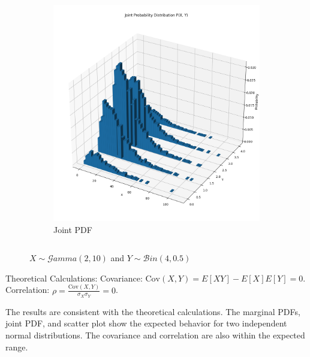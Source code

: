 \documentclass{article}
\begin{document}
\begin{figure}[H]
\begin{subfigure}{0.45\textwidth}
    \includegraphics[width=\linewidth]{results/section2/c(2).png}
    \caption{Joint PDF}
  \end{subfigure}

  \begin{subfigure}{\textwidth}
    \inputminted{text}{results/section2/c.txt}
  \end{subfigure}
  \caption{$X \sim \mathcal{G}amma(2,10)$ and $Y \sim \mathcal{B}in(4,0.5)$}
\end{figure}
Theoretical Calculations:
Covariance: $\text{Cov}(X,Y) = E[XY] - E[X]E[Y] = 0$.
Correlation: $\rho = \frac{\text{Cov}(X,Y)}{\sigma_X\sigma_Y} = 0$.

The results are consistent with the theoretical calculations. The marginal PDFs, joint PDF, and scatter plot show the expected behavior for two independent normal distributions. The covariance and correlation are also within the expected range.
\newpage
\end{document}

